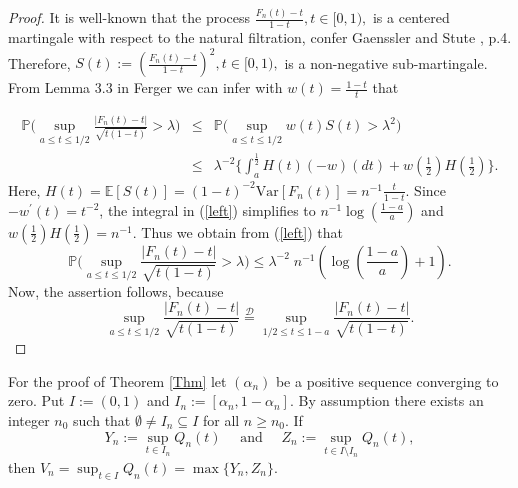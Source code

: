 \documentclass[sn-mathphys,Numbered]{sn-jnl}%
\theoremstyle{thmstyleone}%
\theoremstyle{thmstyletwo}%
\theoremstyle{thmstylethree}%
\begin{document}
\begin{proof} It is well-known that the process $\frac{F_n(t)-t}{1-t}, t \in [0,1),$ is a centered martingale with respect to the natural filtration, confer Gaenssler and Stute \cite{Gaenssler}, p.4. Therefore, $S(t):= (\frac{F_n(t)-t}{1-t})^2, t \in [0,1),$ is a non-negative sub-martingale.
From Lemma 3.3 in Ferger \cite{Ferger1} we can infer with $w(t)=\frac{1-t}{t}$ that

\begin{eqnarray}
\mathbb{P}\big(\sup_{a \le t \le 1/2} \frac{|F_n(t)-t|}{\sqrt{t(1-t)}} > \lambda \big)
&\le&\mathbb{P}\big(\sup_{a \le t \le 1/2} w(t) S(t) > \lambda^2 \big) \nonumber\\
&\le& \lambda^{-2}\{\int_a^{\frac{1}{2}} H(t) (-w)(dt)+w(\frac{1}{2}) H(\frac{1}{2})\}. \label{left}
\end{eqnarray}
Here, $H(t)=\mathbb{E}[S(t)]= (1-t)^{-2} \text{Var}[F_n(t)]= n^{-1} \frac{t}{1-t}.$ Since $-w^\prime(t)=t^{-2}$, the integral in (\ref{left}) simplifies to
$n^{-1} \log(\frac{1-a}{a})$ and $w(\frac{1}{2}) H(\frac{1}{2})=n^{-1}$. Thus we obtain from (\ref{left}) that
$$
 \mathbb{P}\big(\sup_{a \le t \le 1/2} \frac{|F_n(t)-t|}{\sqrt{t(1-t)}} > \lambda \big) \le \lambda^{-2} \; n^{-1} (\log(\frac{1-a}{a})+1).
$$
Now, the assertion follows, because $$\sup_{a \le t \le 1/2} \frac{|F_n(t)-t|}{\sqrt{t(1-t)}} \stackrel{\mathcal{D}}{=} \sup_{1/2 \le t \le 1-a} \frac{|F_n(t)-t|}{\sqrt{t(1-t)}}.$$
\end{proof}

For the proof of Theorem \ref{Thm} let $(\alpha_n)$ be a positive sequence converging to zero. Put $I:=(0,1)$ and $I_n:=[\alpha_n,1-\alpha_n]$. By assumption there exists an integer $n_0$ such that $\emptyset \neq I_n \subseteq I$ for all $n \ge n_0$. If
$$
 Y_n := \sup_{t \in I_n} Q_n(t) \quad \text{ and } \quad Z_n:=\sup_{t \in I \setminus I_n} Q_n(t),
$$
then $V_n= \sup_{t \in I} Q_n(t) = \max \{Y_n,Z_n\}.$\\
\end{document}
